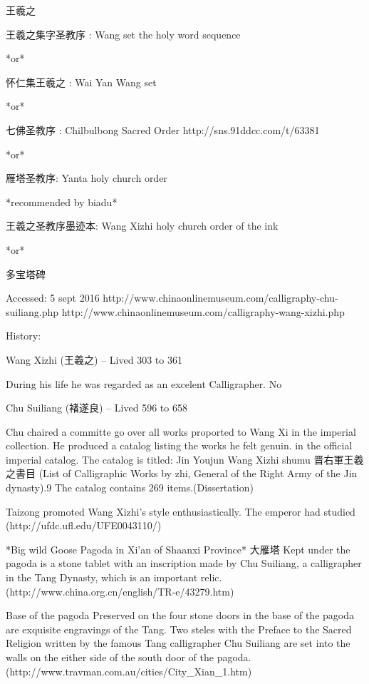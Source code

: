 王羲之

王羲之集字圣教序 : Wang set the holy word sequence

*or*

怀仁集王羲之 : Wai Yan Wang set

*or*

七佛圣教序 : Chilbulbong Sacred Order  http://sns.91ddcc.com/t/63381

*or*

雁塔圣教序: Yanta holy church order

*recommended by biadu*

王羲之圣教序墨迹本: Wang Xizhi holy church order of the ink

*or*

多宝塔碑

Accessed:  5 sept 2016
http://www.chinaonlinemuseum.com/calligraphy-chu-suiliang.php 
http://www.chinaonlinemuseum.com/calligraphy-wang-xizhi.php


History:

Wang Xizhi (王羲之) -- Lived 303 to 361

During his life he was regarded as an excelent Calligrapher.
No


Chu Suiliang (褚遂良) -- Lived 596 to 658


Chu chaired a committe go over all works proported to Wang Xi in the imperial collection.  He produced a catalog listing the works he felt genuin. in the official imperial catalog.  The catalog is titled: 
Jin Youjun Wang Xizhi shumu 晋右軍王羲之書目 (List of Calligraphic Works by zhi, General of the Right Army of the Jin dynasty).9 The catalog contains 269 items.(Dissertation)

Taizong promoted Wang Xizhi's style enthusiastically.  The emperor had studied 
(http://ufdc.ufl.edu/UFE0043110/)







*Big wild Goose Pagoda in Xi'an of Shaanxi Province* 大雁塔
Kept under the pagoda is a stone tablet with an inscription made by Chu Suiliang, a calligrapher in the Tang Dynasty, which is an important relic. (http://www.china.org.cn/english/TR-e/43279.htm)

Base of the pagoda
Preserved on the four stone doors in the base of the pagoda are exquisite engravings of the Tang. Two steles with the Preface to the Sacred Religion written by the famous Tang calligrapher Chu Suiliang are set into the walls on the either side of the south door of the pagoda. (http://www.travman.com.au/cities/City_Xian_1.htm)

